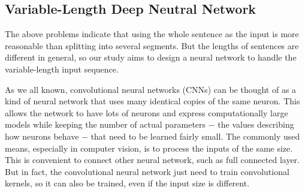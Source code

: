 \documentclass[a4paper]{article}
\begin{document}

\subsection{Variable-Length Deep Neutral Network}
\label{ssec:var_len_dnn}

The above problems indicate that using the whole sentence as the input is more reasonable than splitting into several segments. But the lengths of sentences are different in general, so our study aims to design a neural network to handle the variable-length input sequence. 

As we all known, convolutional neural networks (CNNs) can be thought of as a kind of neural network that uses many identical copies of the same neuron. This allows the network to have lots of neurons and express computationally large models while keeping the number of actual parameters $-$ the values describing how neurons behave $-$ that need to be learned fairly small. The commonly used means, especially in computer vision, is to process the inputs of the same size. This is convenient to connect other neural network, such as full connected layer. But in fact, the convolutional neural network just need to train convolutional kernels, so it can also be trained, even if the input size is different.
\end{document}

